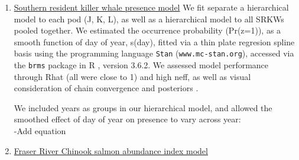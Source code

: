 \documentclass{article}
\begin{document}
\begin{enumerate}
\item \underline{Southern resident killer whale presence model}
We fit separate a hierarchical model to each pod (J, K, L), as well as a hierarchical model to all SRKWs pooled together. We estimated the occurrence probability (Pr(z=1)), as a smooth function of day of year, s(day), fitted via a thin plate regresion spline basis using the programming language \texttt{Stan} \citep{Carpenter:2016aa} (\texttt{www.mc-stan.org}), accessed via the \texttt{brms}\citep{brms2017,brms2018} package in R \citep{Rcore2019}, version 3.6.2. We assessed model performance through Rhat (all were close to 1) and high neff, as well as visual consideration of chain convergence and posteriors \citep{BDA}.
\par We included years as groups in our hierarchical model, and allowed the smoothed effect of day of year on presence to vary across year: 
\\-Add equation
\item \underline{Fraser River Chinook salmon abundance index model}


\end{enumerate}
\end{document}
